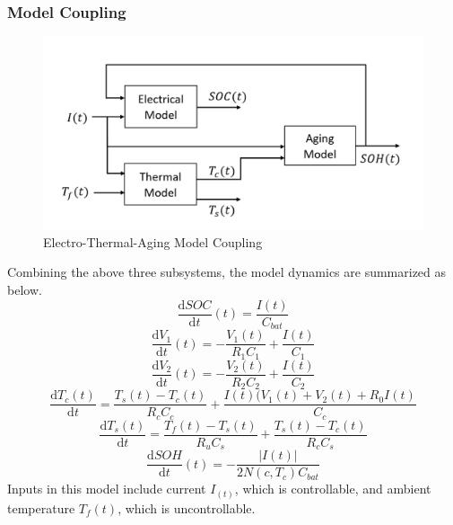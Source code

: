 \documentclass[12pt]{article}
\begin{document}
\subsubsection{Model Coupling}
\begin{figure}[H]
	\centering
	\includegraphics[height=0.3\textwidth]{figures/coupling.png}
	\caption{Electro-Thermal-Aging Model Coupling}
	\label{p2}
\end{figure}
\noindent Combining the above three subsystems, the model dynamics are summarized as below.
\begin{equation}
\frac{\mathrm{d} SOC}{\mathrm{d}t}(t) = \frac{I(t)}{C_{bat}}
\end{equation}
\begin{equation}
\frac{\mathrm{d} V_1}{\mathrm{d}t}(t) = -\frac{V_1(t)}{R_1C_1}+\frac{I(t)}{C_1}
\end{equation}
\begin{equation}
\frac{\mathrm{d} V_2}{\mathrm{d}t}(t) = -\frac{V_2(t)}{R_2C_2}+\frac{I(t)}{C_2}
\end{equation}
\begin{equation}
\frac{\mathrm{d}T_c(t)}{\mathrm{d} t} = \frac{T_s(t)-T_c(t)}{R_cC_c}+\frac{I(t)(V_1(t)+V_2(t)+R_0I(t)}{C_c}
\end{equation}
\begin{equation}
\frac{\mathrm{d}T_s(t)}{\mathrm{d} t} = \frac{T_f(t)-T_s(t)}{R_uC_s}+\frac{T_s(t)-T_c(t)}{R_cC_s}
\end{equation}
\begin{equation}
\frac{\mathrm{d} SOH}{\mathrm{d}t}(t) = -\frac{|I(t)|}{2N(c, T_c) C_{bat}}
\end{equation}
\noindent Inputs in this model include current $I_(t)$, which is controllable, and ambient temperature $T_f(t)$, which is uncontrollable. 
\end{document}
